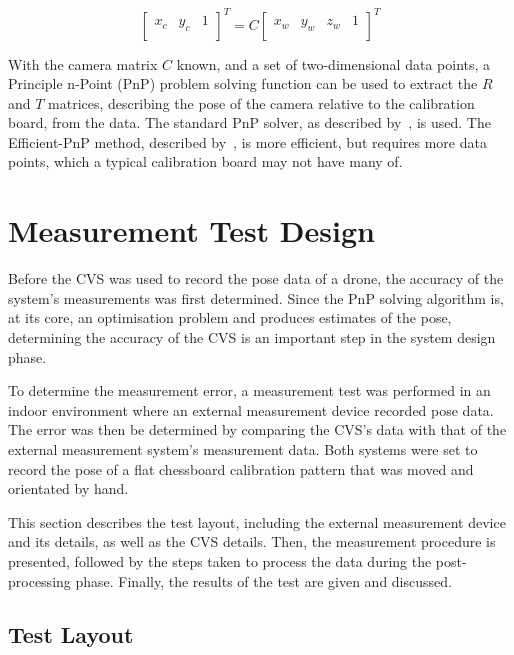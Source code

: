 \begin{equation}
   \label{eq:2d-to-3d}
   \begin{bmatrix}
     x_c & y_c & 1 \\
   \end{bmatrix}^T
   = C
   \begin{bmatrix}
     x_w & y_w & z_w & 1 \\
   \end{bmatrix}^T
 \end{equation}

With the camera matrix $C$ known, and a set of two-dimensional data points, a Principle n-Point (PnP) problem solving function can be used to extract the $R$ and $T$ matrices, describing the pose of the camera relative to the calibration board, from the data. The standard PnP solver, as described by~\cite{Schweighofer2006}, is used. The Efficient-PnP method, described by~\cite{Lepetit2008}, is more efficient, but requires more data points, which a typical calibration board may not have many of.

\section{Measurement Test Design}

Before the CVS was used to record the pose data of a drone, the accuracy of the system's measurements was first determined. Since the PnP solving algorithm is, at its core, an optimisation problem and produces estimates of the pose, determining the accuracy of the CVS is an important step in the system design phase. 

To determine the measurement error, a measurement test was performed in an indoor environment where an external measurement device recorded pose data. The error was then be determined by comparing the CVS's data with that of the external measurement system's measurement data. Both systems were set to record the pose of a flat chessboard calibration pattern that was moved and orientated by hand.

This section describes the test layout, including the external measurement device and its details, as well as the CVS details. Then, the measurement procedure is presented, followed by the steps taken to process the data during the post-processing phase. Finally, the results of the test are given and discussed. 

\subsection{Test Layout}
\label{sec:vicon-test-setup}

